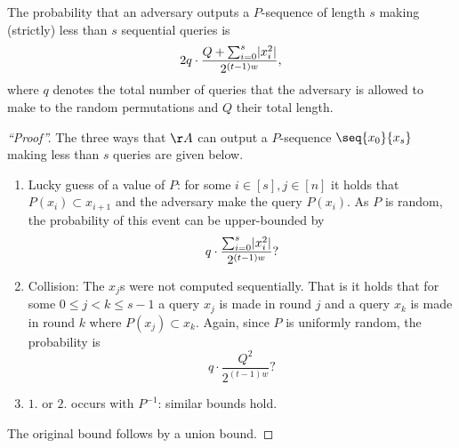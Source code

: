 \documentclass[a4paper,12pt]{article}
\begin{document}
    \begin{claim}
      The probability that an adversary outputs a $P$-sequence of length $s$ making (strictly) less than $s$ sequential queries is 
	\[2q\cdot\frac{Q+\sum_{i=0}^s \lvert x_i^2\rvert}{2^{(t-1)w}},\]
      where $q$ denotes the total number of queries that the adversary is allowed to make to the random permutations and $Q$ their total length.
    \end{claim}
    \begin{proof}[``Proof'']
      The three ways that $\AA$ can output a $P$-sequence $\seq{x_0}{x_s}$ making less than $s$ queries are given below.
	\begin{enumerate}
	  \item Lucky guess of a value of $P$: for some $i\in[s],j\in[n]$ it holds that $P(x_i)\subset x_{i+1}$ and the adversary  make the query $P(x_i)$. As $P$ is random, the probability of this event can be upper-bounded by 
	    \[q\cdot\frac{\sum_{i=0}^s \lvert x_i^2\rvert}{2^{(t-1)w}}?\]
	  \item Collision: The $x_j$s were not computed sequentially. That is it holds that for some $0\leq j< k\leq s-1$ a query $x_j$ is made in round $j$ and a query $x_k$ is made in round $k$ where $P(x_j)\subset x_k$. Again, since $P$ is uniformly random, the probability is 
	    \[q\cdot\frac{Q^2}{2^{(t-1)w}}?\]
	  \item $1.$ or $2.$ occurs with $P^{-1}$: similar bounds hold.
	\end{enumerate}
      The original bound follows by a union bound.
    \end{proof}
\end{document}
